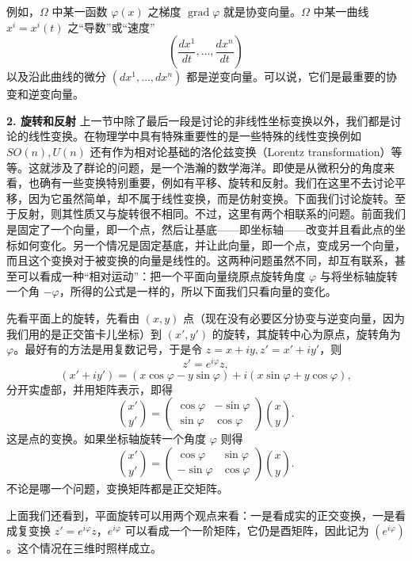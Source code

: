 例如，$\Omega$ 中某一函数 $\varphi(x)$ 之梯度 $\operatorname{grad}\varphi$ 就是协变向量。$\Omega$ 中某一曲线 $x^i=x^i(t)$ 之“导数”或“速度”
\[
 \left(\frac{dx^1}{dt},\ldots,\frac{dx^n}{dt}\right)
\]
以及沿此曲线的微分 $(dx^1,\ldots,dx^n)$ 都是逆变向量。可以说，它们是最重要的协变和逆变向量。

\medskip
\noindent\textbf{2. 旋转和反射}\quad
上一节中除了最后一段是讨论的非线性坐标变换以外，我们都是讨论的线性变换。在物理学中具有特殊重要性的是一些特殊的线性变换例如 $SO(n),U(n)$ 还有作为相对论基础的洛伦兹变换（Lorentz transformation）等等。这就涉及了群论的问题，是一个浩瀚的数学海洋。即使是从微积分的角度来看，也确有一些变换特别重要，例如有平移、旋转和反射。我们在这里不去讨论平移，因为它虽然简单，却不属于线性变换，而是仿射变换。下面我们讨论旋转。至于反射，则其性质又与旋转很不相同。不过，这里有两个相联系的问题。前面我们是固定了一个向量，即一个点，然后让基底——即坐标轴——改变并且看此点的坐标如何变化。另一个情况是固定基底，并让此向量，即一个点，变成另一个向量，而且这个变换对于被变换的向量是线性的。这两种问题虽然不同，却互有联系，甚至可以看成一种“相对运动”：把一个平面向量绕原点旋转角度 $\varphi$ 与将坐标轴旋转一个角 $-\varphi$，所得的公式是一样的，所以下面我们只看向量的变化。

先看平面上的旋转，先看由 $(x,y)$ 点（现在没有必要区分协变与逆变向量，因为我们用的是正交笛卡儿坐标）到 $(x',y')$ 的旋转，其旋转中心为原点，旋转角为 $\varphi$。最好有的方法是用复数记号，于是令 $z=x+iy,z'=x'+iy'$，则
\begin{equation}
 z'=e^{i\varphi}z,
 \tag{23}
\end{equation}
\[
 (x'+iy')=(x\cos\varphi-y\sin\varphi)+i(x\sin\varphi+y\cos\varphi),
\]
分开实虚部，并用矩阵表示，即得
\begin{equation}
 \binom{x'}{y'}=
 \begin{pmatrix}
 \cos\varphi&-\sin\varphi\\
 \sin\varphi&\cos\varphi
 \end{pmatrix}
 \binom{x}{y}.
 \tag{24}
\end{equation}
这是点的变换。如果坐标轴旋转一个角度 $\varphi$ 则得
\begin{equation}
 \binom{x'}{y'}=
 \begin{pmatrix}
 \cos\varphi&\sin\varphi\\
 -\sin\varphi&\cos\varphi
 \end{pmatrix}
 \binom{x}{y}.
 \tag{24'}
\end{equation}
不论是哪一个问题，变换矩阵都是正交矩阵。

上面我们还看到，平面旋转可以用两个观点来看：一是看成实的正交变换，一是看成复变换 $z'=e^{i\varphi}z$，$e^{i\varphi}$ 可以看成一个一阶矩阵，它仍是酉矩阵，因此记为 $(e^{i\varphi})$。这个情况在三维时照样成立。

